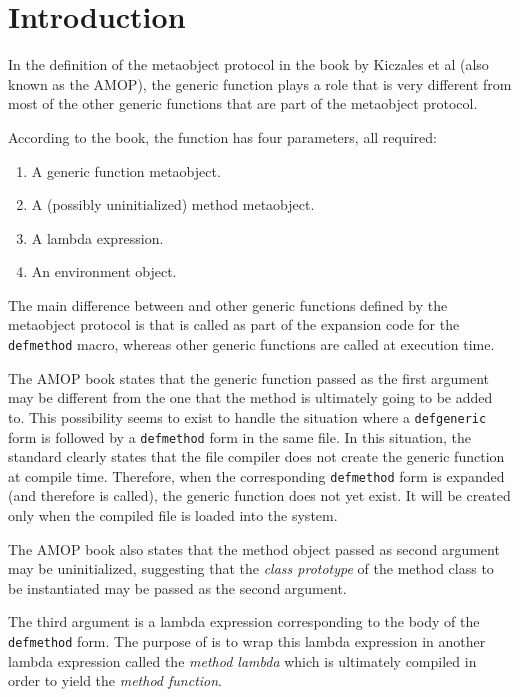 \section{Introduction}

In the definition of the \commonlisp{} \cite{ansi:common:lisp}
metaobject protocol in the book by Kiczales et al
\cite{Kiczales:1991:AMP:574212} (also known as the AMOP), the generic
function \mml{} plays a role that is very
different from most of the other generic functions that are part of
the metaobject protocol.

According to the book, the function has four parameters, all required:

\begin{enumerate}
\item A generic function metaobject.
\item A (possibly uninitialized) method metaobject.
\item A lambda expression.
\item An environment object.
\end{enumerate}

The main difference between \mml{} and other
generic functions defined by the metaobject protocol is that
\mml{} is called as part of the expansion code
for the \texttt{defmethod} macro, whereas other generic functions are
called at execution time.

The AMOP book states that the generic function passed as the first
argument may be different from the one that the method is ultimately
going to be added to.  This possibility seems to exist to handle the
situation where a \texttt{defgeneric} form is followed by a
\texttt{defmethod} form in the same file.  In this situation, the
\commonlisp{} standard clearly states that the file compiler does not
create the generic function at compile time.  Therefore, when the
corresponding \texttt{defmethod} form is expanded (and therefore
\mml{} is called), the generic function does not
yet exist.  It will be created only when the compiled file is loaded
into the \commonlisp{} system.

The AMOP book also states that the method object passed as second
argument may be uninitialized, suggesting that the \emph{class
  prototype} of the method class to be instantiated may be passed as
the second argument.

The third argument is a lambda expression corresponding to the body of
the \texttt{defmethod} form.  The purpose of
\mml{} is to wrap this lambda expression in
another lambda expression called the \emph{method lambda} which is
ultimately compiled in order to yield the \emph{method function}.

